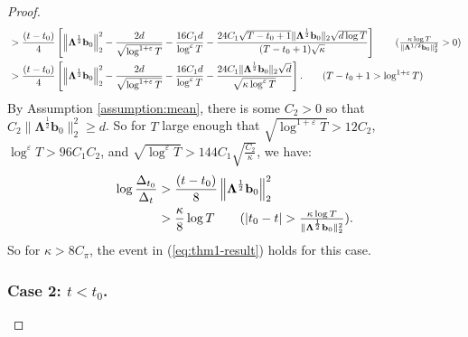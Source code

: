 \begin{proof}
\begin{align*}
    &> \frac{(t-t_0)}{4}\left[\left\lVert\boldsymbol{\Lambda}^{\frac{1}{2}}\mathbf{b}_0\right\rVert_2^2 - \frac{2d}{\sqrt{\log^{1+\varepsilon}  T}} - \frac{16C_1 d}{\log^{\varepsilon}T}  - \frac{24C_1\sqrt{T-t_0+1}\lVert\boldsymbol{\Lambda}^{\frac{1}{2}}\mathbf{b}_0\rVert_2\sqrt{d\log T}}{(T-t_0+1)\sqrt{\kappa}}\right] \tag{$\frac{\kappa\log T}{\lVert\boldsymbol{\Lambda}^{1/2}\mathbf{b}_0\rVert_2^2} > 0$} \\
    &> \frac{(t-t_0)}{4}\left[\left\lVert\boldsymbol{\Lambda}^{\frac{1}{2}}\mathbf{b}_0\right\rVert_2^2 - \frac{2d}{\sqrt{\log^{1+\varepsilon}  T}} - \frac{16C_1 d}{\log^{\varepsilon}T}  - \frac{24C_1\lVert\boldsymbol{\Lambda}^{\frac{1}{2}}\mathbf{b}_0\rVert_2\sqrt{d}}{\sqrt{\kappa\log^{\varepsilon}T}}\right]. \tag{$T-t_0+1 > \log^{1+\varepsilon} T$} 
\end{align*}
\normalsize
By Assumption \ref{assumption:mean}, there is some $C_2 > 0$ so that $C_2 \lVert\boldsymbol{\Lambda}^{\frac{1}{2}}\mathbf{b}_0\rVert_2^2 \geq d$. So for $T$ large enough that $\sqrt{\log^{1+\varepsilon}  T} > 12 C_2 $, $\log^{\varepsilon} T > 96 C_1 C_2 $, and $\sqrt{\log^{\varepsilon} T} > 144C_1\sqrt{\frac{C_2 }{\kappa}}$, we have:
\begin{align*}
    \log \frac{\Delta_{t_0}}{\Delta_t} &> \frac{(t-t_0)}{8}\left\lVert\boldsymbol{\Lambda}^{\frac{1}{2}}\mathbf{b}_0\right\rVert_2^2 \\
    &> \frac{\kappa}{8} \log T\tag{$|t_0-t| > \frac{\kappa\log T}{\lVert\boldsymbol{\Lambda}^{\frac{1}{2}}\mathbf{b}_0\rVert_2^2}$}.
\end{align*}
So for $\kappa > 8 C_\pi$, the event in (\ref{eq:thm1-result}) holds for this case.

\subsubsection*{Case 2: $t < t_0$.}


\end{proof}
